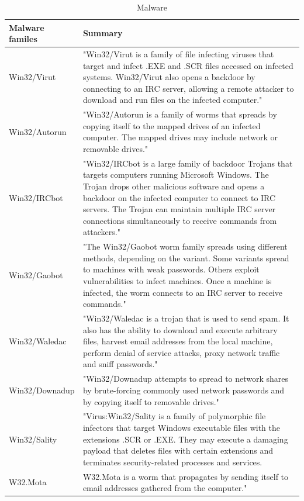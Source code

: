 \begin{center}
\begin{table}
\begin{tabular}{ l | p{13cm} }
Malware familes & Summary\\ \hline
Win32/Virut & "Win32/Virut is a family of file infecting viruses that target and infect .EXE and .SCR files accessed on infected systems.
 Win32/Virut also opens a backdoor by connecting to an IRC server, allowing a remote attacker to download and run files on the infected computer." \cite{virut}\\ \hline
Win32/Autorun & "Win32/Autorun is a family of worms that spreads by copying itself to the mapped drives of an infected computer. The mapped drives may include network or removable drives." \cite{autorun}\\\hline
Win32/IRCbot & "Win32/IRCbot is a large family of backdoor Trojans that targets computers running Microsoft Windows. The Trojan drops other malicious software and opens a backdoor on the infected computer to connect to IRC servers. The Trojan can maintain multiple IRC server connections simultaneously to receive commands from attackers." \cite{ircbot}\\ \hline
Win32/Gaobot & "The Win32/Gaobot worm family spreads using different methods, depending on the variant. Some variants spread to machines with weak passwords. Others exploit vulnerabilities to infect machines. Once a machine is infected, the worm connects to an IRC server to receive commands." \cite{gaobot}\\ \hline
Win32/Waledac & "Win32/Waledac is a trojan that is used to send spam. It also has the ability to download and execute arbitrary files, harvest email addresses from the local machine, perform denial of service attacks, proxy network traffic and sniff passwords." \cite{walemac}\\ \hline
Win32/Downadup & "Win32/Downadup attempts to spread to network shares by brute-forcing commonly used network passwords and by copying itself to removable drives." \cite{downadup}\\ \hline 
Win32/Sality & "Virus:Win32/Sality is a family of polymorphic file infectors that target Windows executable files with the extensions .SCR or .EXE. They may execute a damaging payload that deletes files with certain extensions and terminates security-related processes and services.\\ \hline 
W32.Mota & W32.Mota is a worm that propagates by sending itself to email addresses gathered from the computer." \cite{mota}\\ \hline 
\end{tabular}
\caption{Malware}
\label{tab:malwarefamilies}
\end{table}
\end{center}

